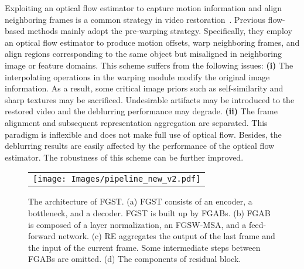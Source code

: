 \documentclass{article}
\begin{document}
	Exploiting an optical flow estimator to capture motion information and align neighboring frames is a common strategy in video restoration~\cite{makansi2017end,Su,xue2019video,tsp}. Previous flow-based methods mainly adopt the pre-warping strategy. Specifically, they employ an optical flow estimator to produce motion offsets, warp neighboring frames, and align regions corresponding to the same object but misaligned in neighboring image or feature domains. This scheme suffers from the following issues: \textbf{(i)} The interpolating operations in the warping module modify the original image information. As a result, some critical image priors such as self-similarity and sharp textures may be sacrificed. Undesirable artifacts may be introduced to the restored video and the deblurring performance may degrade. \textbf{(ii)} The frame alignment and subsequent representation aggregation are separated. This paradigm is inflexible and does not make full use of optical flow. Besides, the deblurring results are easily affected by the performance of the optical flow estimator. The robustness of this scheme can be further improved.
	
	\begin{figure*}[t]
		\begin{center}
			\begin{tabular}[t]{c} \hspace{-2mm}
				\texttt{[image: Images/pipeline\_new\_v2.pdf]}
			\end{tabular}
		\end{center}
		\vspace*{-6.5mm}
		\caption{\small The architecture of FGST. (a) FGST consists of an encoder, a bottleneck, and a decoder. FGST is built up by FGABs. (b) FGAB is composed of a layer normalization, an FGSW-MSA, and a feed-forward network. (c) RE aggregates the output of the last frame and the input of the current frame. Some intermediate steps between FGABs are omitted. (d) The components of residual block.}
		\label{fig:pipeline}
		\vspace{-1mm}
	\end{figure*}
	
\end{document}
